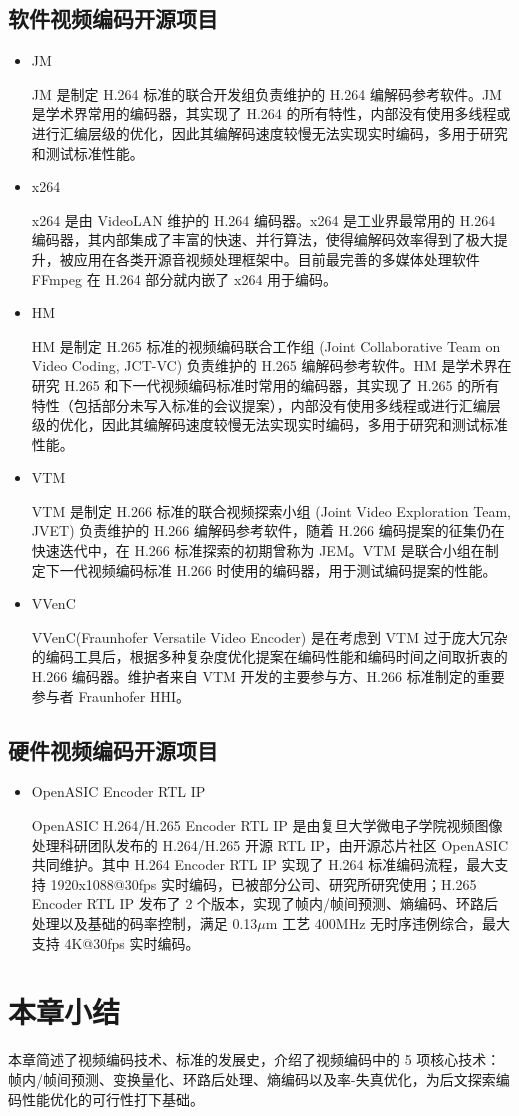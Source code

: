 \subsection{软件视频编码开源项目}
\begin{itemize}
    \item JM

          JM 是制定 H.264 标准的联合开发组负责维护的 H.264 编解码参考软件。JM 是学术界常用的编码器，其实现了 H.264 的所有特性，内部没有使用多线程或进行汇编层级的优化，因此其编解码速度较慢无法实现实时编码，多用于研究和测试标准性能。

    \item x264

          x264 是由 VideoLAN 维护的 H.264 编码器。x264 是工业界最常用的 H.264 编码器，其内部集成了丰富的快速、并行算法，使得编解码效率得到了极大提升，被应用在各类开源音视频处理框架中。目前最完善的多媒体处理软件 FFmpeg 在 H.264 部分就内嵌了 x264 用于编码。

    \item HM

          HM 是制定 H.265 标准的视频编码联合工作组 (Joint Collaborative Team on Video Coding, JCT-VC) 负责维护的 H.265 编解码参考软件。HM 是学术界在研究 H.265 和下一代视频编码标准时常用的编码器，其实现了 H.265 的所有特性（包括部分未写入标准的会议提案），内部没有使用多线程或进行汇编层级的优化，因此其编解码速度较慢无法实现实时编码，多用于研究和测试标准性能。

    \item VTM

          VTM 是制定 H.266 标准的联合视频探索小组 (Joint Video Exploration Team, JVET) 负责维护的 H.266 编解码参考软件，随着 H.266 编码提案的征集仍在快速迭代中，在 H.266 标准探索的初期曾称为 JEM。VTM 是联合小组在制定下一代视频编码标准 H.266 时使用的编码器，用于测试编码提案的性能。

    \item VVenC

          VVenC(Fraunhofer Versatile Video Encoder) 是在考虑到 VTM 过于庞大冗杂的编码工具后，根据多种复杂度优化提案在编码性能和编码时间之间取折衷的 H.266 编码器。维护者来自 VTM 开发的主要参与方、H.266 标准制定的重要参与者 Fraunhofer HHI。
\end{itemize}

\subsection{硬件视频编码开源项目}
\begin{itemize}
    \item OpenASIC Encoder RTL IP

          OpenASIC H.264/H.265 Encoder RTL IP 是由复旦大学微电子学院视频图像处理科研团队发布的 H.264/H.265 开源 RTL IP，由开源芯片社区 OpenASIC 共同维护。其中 H.264 Encoder RTL IP 实现了 H.264 标准编码流程，最大支持 1920x1088@30fps 实时编码，已被部分公司、研究所研究使用；H.265 Encoder RTL IP 发布了 2 个版本，实现了帧内/帧间预测、熵编码、环路后处理以及基础的码率控制，满足 0.13$\mu$m 工艺 400MHz 无时序违例综合，最大支持 4K@30fps 实时编码。
\end{itemize}

\section{本章小结}
本章简述了视频编码技术、标准的发展史，介绍了视频编码中的 5 项核心技术：帧内/帧间预测、变换量化、环路后处理、熵编码以及率-失真优化，为后文探索编码性能优化的可行性打下基础。